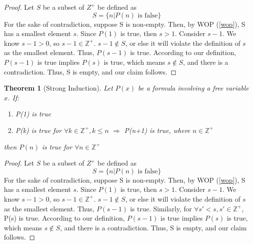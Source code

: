 \documentclass{article}
\newcommand{\Z}{\mathbb{Z}}
\newcommand{\FTSOC}{For the sake of contradiction}
\newtheorem{thm}{Theorem}[section]
\begin{document}
\begin{proof}
Let $S$ be a subset of $Z^{+}$ be defined as 
\begin{equation}
    S=\{n|P(n)\text{ is false}\}
\end{equation}
\FTSOC, suppose S is non-empty. Then, by WOP (\ref{wop}),  S has a smallest element $s$. Since $P(1)$ is true, then $s>1$. Consider $s-1$. We know $s-1>0$, so $s-1\in \Z^{+}$. $s-1\not\in S$, or else it will violate the definition of $s$ as the smallest element. Thus, $P(s-1)$ is true. According to our definition, $P(s-1)$ is true implies $P(s)$ is true, which means $s\not\in S$, and there is a contradiction. Thus, S is empty, and our claim follows. 
\end{proof}
\begin{thm}[Strong Induction]
\label{strong induction}
Let $P(x)$ be a formula involving a free variable $x$. If: 
\begin{enumerate}
    \item P(1) is true
    \item P(k) is true for $\forall k\in \Z^{+}, k\leq n$ $\Rightarrow$ P(n+1) is true, where $n\in \Z^{+}$
\end{enumerate}
then $P(n)$ is true for $\forall n\in \Z^{+}$
\end{thm}
\begin{proof}
Let $S$ be a subset of $Z^{+}$ be defined as 
\begin{equation}
    S=\{n|P(n)\text{ is false}\}
\end{equation}
\FTSOC, suppose S is non-empty. Then, by WOP (\ref{wop}),  S has a smallest element $s$. Since $P(1)$ is true, then $s>1$. Consider $s-1$. We know $s-1>0$, so $s-1\in \Z^{+}$. $s-1\not\in S$, or else it will violate the definition of $s$ as the smallest element. Thus, $P(s-1)$ is true. Similarly, for $\forall s'<s, s'\in \Z^{+}$, P(s) is true. According to our definition, $P(s-1)$ is true implies $P(s)$ is true, which means $s\not\in S$, and there is a contradiction. Thus, S is empty, and our claim follows.
\end{proof}
\end{document}
